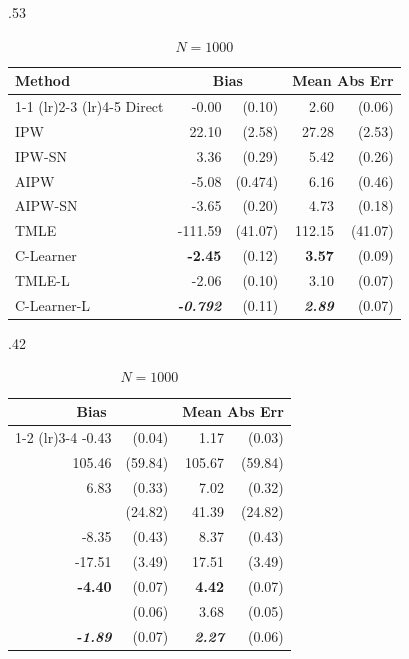 \begin{table}[t]
\footnotesize
\centering
\hfill
\begin{subtable}{.53\linewidth}
\centering
\caption{$N=200$} %
\begin{tabular}{lrrrr}
\toprule
 Method & \multicolumn{2}{c}{Bias} & \multicolumn{2}{c}{Mean Abs Err} \\
\cmidrule(lr){1-1}
\cmidrule(lr){2-3}
\cmidrule(lr){4-5}
Direct & -0.00 & (0.10) & 2.60 & (0.06)\\
IPW & 22.10 & (2.58) & 27.28 & (2.53) \\
IPW-SN & 3.36 & (0.29) & 5.42 & (0.26)\\
\greymidrule
AIPW & -5.08 & (0.474) & 6.16 & (0.46) \\
AIPW-SN & -3.65 & (0.20) & 4.73 & (0.18) \\
TMLE & -111.59 & (41.07) & 112.15 & (41.07) \\
C-Learner & \textbf{-2.45} & (0.12) & \textbf{3.57} & (0.09) \\
\greydashedmidrule
TMLE-L & -2.06 & (0.10) & 3.10 & (0.07) \\
C-Learner-L & \textit{\textbf{-0.792}} & (0.11) & \textit{\textbf{2.89}} & (0.07) \\
\bottomrule
\end{tabular}
\end{subtable}
\hspace{-3.15em}
\begin{subtable}{.42\linewidth}
\centering
\caption{$N=1000$} %
\begin{tabular}{rrrr}
\toprule
 \multicolumn{2}{c}{Bias} & \multicolumn{2}{c}{Mean Abs Err} \\
\cmidrule(lr){1-2}
\cmidrule(lr){3-4}
-0.43 & (0.04) & 1.17 & (0.03)\\
 105.46 & (59.84) & 105.67 & (59.84) \\
6.83 & (0.33) & 7.02 & (0.32) \\
\greymidrule
-41.37 & (24.82) & 41.39 & (24.82) \\
-8.35 & (0.43) & 8.37 & (0.43) \\
-17.51 & (3.49) & 17.51 & (3.49) \\
\textbf{-4.40} & (0.07) & \textbf{4.42} & (0.07) \\
\greydashedmidrule
-3.68 & (0.06) & 3.68 & (0.05) \\
\textit{\textbf{-1.89}} & (0.07) & \textit{\textbf{2.27}} & (0.06) \\
\bottomrule
\end{tabular}
\end{subtable}

\end{table}
